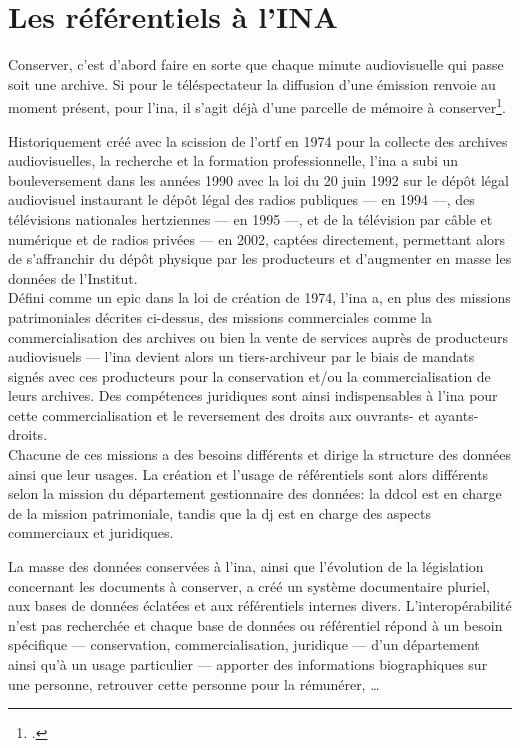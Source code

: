 \chapter{\label{I-B}Les référentiels à l’INA}

\begin{citationLongue}
	Conserver, c’est d’abord faire en sorte que chaque minute audiovisuelle qui passe soit une archive. Si pour le téléspectateur la diffusion d’une émission renvoie au moment présent, pour l’\ac{ina}, il s’agit déjà d’une parcelle de mémoire à conserver\footcite[p.45]{hoog_lina_2006}.
\end{citationLongue}
Historiquement créé avec la scission de l'\ac{ortf} en 1974 pour la collecte des archives audiovisuelles, la recherche et la formation professionnelle, l'\ac{ina} a subi un bouleversement dans les années 1990 avec la loi du 20 juin 1992 sur le dépôt légal audiovisuel instaurant le dépôt légal des radios publiques --- en 1994 ---, des télévisions nationales hertziennes --- en 1995 ---, et de la télévision par câble et numérique et de radios privées --- en 2002, captées directement, permettant alors de s'affranchir du dépôt physique par les producteurs et d'augmenter en masse les données de l'Institut.\\

Défini comme un \ac{epic} dans la loi de création de 1974, l'\ac{ina} a, en plus des missions patrimoniales décrites ci-dessus, des missions commerciales comme la commercialisation des archives ou bien la vente de services auprès de producteurs audiovisuels --- l'\ac{ina} devient alors un tiers-archiveur par le biais de mandats signés avec ces producteurs pour la conservation et/ou la commercialisation de leurs archives. Des compétences juridiques sont ainsi indispensables à l'\ac{ina} pour cette commercialisation et le reversement des droits aux ouvrants- et ayants-droits.\\

Chacune de ces missions a des besoins différents et dirige la structure des données  ainsi que leur usages. La création et l'usage de référentiels sont alors différents selon la mission du département gestionnaire des données: la \ac{ddcol} est en charge de la mission patrimoniale, tandis que la \ac{dj} est en charge des aspects commerciaux et juridiques.





\bigskip
\bigskip
\bigskip

La masse des données conservées à l'\ac{ina}, ainsi que l'évolution de la législation concernant les documents à conserver, a créé un système documentaire pluriel, aux bases de données éclatées et aux référentiels internes divers. L'interopérabilité n'est pas recherchée et chaque base de données ou référentiel répond à un besoin spécifique --- conservation, commercialisation, juridique --- d'un département ainsi qu'à un usage particulier --- apporter des informations biographiques sur une personne, retrouver cette personne pour la rémunérer, \dots